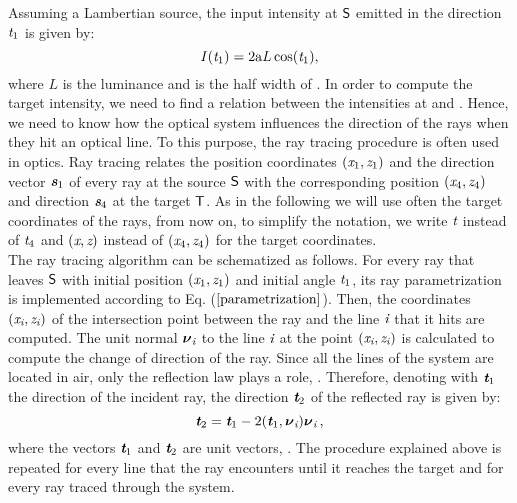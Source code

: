 Assuming a Lambertian source, the input intensity at $\textsf{S}$ emitted in the direction $\textit{t}_1$ is given by:
\begin{equation}\label{lambertian_source}
I(\textit{t}_1) = 2\textrm{a}L\cos(\textit{t}_1),
\end{equation}
where $L$ is the luminance and  is the half width of .
In order to compute the target intensity, we need to find a relation between the intensities at  and .
 Hence, we need to know how the optical system influences the direction of the rays when they hit an optical line.
 To this purpose, the ray tracing procedure is often used in optics.
Ray tracing relates the position coordinates
 $ (\textit{x}_1, \textit{z}_1)$ and the direction vector $\textit{\textbf{s}}_1$ of every ray at the source $\textsf{S}$ with the corresponding position $(\textit{x}_4, \textit{z}_4)$ and direction $\textit{\textbf{s}}_4$ at the target $\textsf{T}$. As in the following we will use often the target coordinates of the rays, from now on, to simplify the notation, we write $\textit{t}$ instead of $\textit{t}_4$ and $(\textit{x}, \textit{z})$ instead of $(\textit{x}_4, \textit{z}_4)$ for the target coordinates.\\ \indent The ray tracing algorithm can be schematized as follows.
 For every ray that leaves $\textsf{S}$ with initial position $(\textit{x}_1, \textit{z}_1)$ and initial angle $\textit{t}_1$, its ray parametrization is implemented according to Eq. ($\ref{parametrization}$). Then, the coordinates $(\textit{x}_{\textit{i}}, \textit{z}_{\textit{i}})$ of the intersection point between the ray and the line $\textit{i}$ that it hits are computed. The unit normal $\boldsymbol{\nu}_{\textit{i}}$ to the line $\textit{i}$ at the point $(\textit{x}_{\textit{i}}, \textit{z}_{\textit{i}})$ is calculated to compute the change of direction of the ray.
 Since all the lines of the system are located in air, only the reflection law plays a role, \cite{Hecht}.
 Therefore, denoting with $\textit{\textbf{t}}_1$ the direction of the incident ray, the direction $\textit{\textbf{t}}_2$ of the reflected ray is given by:
 \begin{equation}\label{reflection}
  \textit{\textbf{t}}_{2} = \textit{\textbf{t}}_1-2(\textit{\textbf{t}}_1,\boldsymbol{\nu}_{\textit{i}})\boldsymbol{\nu}_{\textit{i}}\,,
\end{equation}
where the vectors $\textit{\textbf{t}}_{1}$ and $\textit{\textbf{t}}_{2}$ are unit vectors, \cite{Chaves}.
The procedure explained above is repeated for every line that the ray encounters until it reaches the target and for every ray traced through the system. \\ \indent
